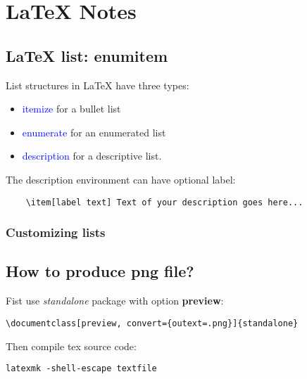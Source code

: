 \cleardoublepage
{}
\appendix
{}

\chapter{\LaTeX{} Notes}

\section{\LaTeX{} list: enumitem}

List structures in \LaTeX{} have three types:

\begin{itemize}
\item \textcolor{blue}{itemize} for a bullet list
\item \textcolor{blue}{enumerate} for an enumerated list
\item \textcolor{blue}{description} for a descriptive list.
\end{itemize}

The description environment can have optional label:
\begin{verbatim}
    \item[label text] Text of your description goes here...
\end{verbatim}

\subsection{Customizing lists}


\section{How to produce png file?}

Fist use \textit{standalone} package with option \textbf{preview}:

\begin{verbatim}
\documentclass[preview, convert={outext=.png}]{standalone}
\end{verbatim}

Then compile tex source code:

\begin{verbatim}
latexmk -shell-escape textfile
\end{verbatim}
